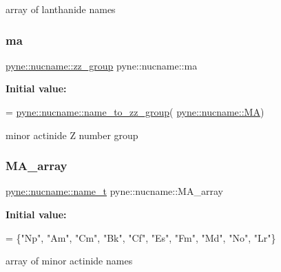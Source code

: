 array of lanthanide names 

\mbox{\label{namespacepyne_1_1nucname_ac487913e792a1d98664af236f1c567b7}} 
\subsubsection{\texorpdfstring{ma}{ma}}
{\footnotesize\ttfamily \hyperlink{namespacepyne_1_1nucname_a2e9463e61005389bbc50bfa210061582}{pyne\+::nucname\+::zz\+\_\+group} pyne\+::nucname\+::ma}

{\bfseries Initial value\+:}
\begin{DoxyCode}
= 
  \hyperlink{namespacepyne_1_1nucname_a0f6bd8d281ff5aa5fd5b48e16b867062}{pyne::nucname::name\_to\_zz\_group}(
      \hyperlink{namespacepyne_1_1nucname_a361c7b8fb365a6e606ab45ef8b5688d8}{pyne::nucname::MA})
\end{DoxyCode}


minor actinide Z number group 

\mbox{\label{namespacepyne_1_1nucname_a1fc606ecf5edbc2390523178c65ac856}} 
\subsubsection{\texorpdfstring{M\+A\+\_\+array}{MA\_array}}
{\footnotesize\ttfamily \hyperlink{namespacepyne_1_1nucname_aed6b656cde69b79b33f6af37fabb2054}{pyne\+::nucname\+::name\+\_\+t} pyne\+::nucname\+::\+M\+A\+\_\+array}

{\bfseries Initial value\+:}
\begin{DoxyCode}
= \{\textcolor{stringliteral}{"Np"}, \textcolor{stringliteral}{"Am"}, \textcolor{stringliteral}{"Cm"}, \textcolor{stringliteral}{"Bk"},
  \textcolor{stringliteral}{"Cf"}, \textcolor{stringliteral}{"Es"}, \textcolor{stringliteral}{"Fm"}, \textcolor{stringliteral}{"Md"}, \textcolor{stringliteral}{"No"}, \textcolor{stringliteral}{"Lr"}\}
\end{DoxyCode}


array of minor actinide names 

\mbox{\label{namespacepyne_1_1nucname_af6669ddbefba8098a45e4fc27edc5c68}} 
